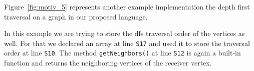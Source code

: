 \begin{example} {\rm
  Figure~\ref{fig:motiv_5} represents another example implementation
    the depth first traversal on a graph in our proposed language. 
    
  In this example we are trying to store the dfs traversal order of the vertices 
    as well. For that we declared an array at line {\tt S17} and used it to 
    store the traversal order at line {\tt S10}. The method {\tt getNeighbors()} 
  at line {\tt S12} is again a built-in function and returns the neighboring 
    vertices of the receiver vertex. 
    \hfill\psframebox{}}
\end{example}
